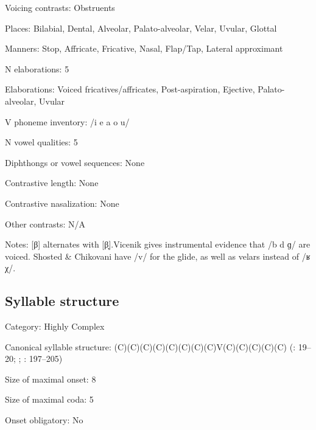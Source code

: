 {\begin{appendixdesc}
\item[Voicing contrasts:] Obstruents

\item[Places:] Bilabial, Dental, Alveolar, Palato-alveolar, Velar, Uvular, Glottal

\item[Manners:] Stop, Affricate, Fricative, Nasal, Flap/Tap, Lateral approximant

\item[N elaborations:] 5

\item[Elaborations:] Voiced fricatives/affricates, Post-aspiration, Ejective, Palato-alveolar, Uvular

\item[V phoneme inventory:] /i e a o u/

\item[N vowel qualities:] 5

\item[Diphthongs or vowel sequences:] None

\item[Contrastive length:] None

\item[Contrastive nasalization:] None

\item[Other contrasts:] N/A

\item[Notes:] [β] alternates with [β̞].Vicenik gives instrumental evidence that /b d ɡ/ are voiced. Shosted \& Chikovani have /v/ for the glide, as well as velars instead of /ʁ χ/.
\end{appendixdesc}
\subsection*{Syllable structure}
\begin{appendixdesc}

\item[Category:] Highly Complex

\item[Canonical syllable structure:] (C)(C)(C)(C)(C)(C)(C)(C)V(C)(C)(C)(C)(C) (\citealt{Hewitt1995}: 19--20; \citealt{Vogt1958}; \citealt{Butskhrikidze2002}: 197--205)

\item[Size of maximal onset:] 8

\item[Size of maximal coda:] 5

\item[Onset obligatory:] No


\end{appendixdesc}}
